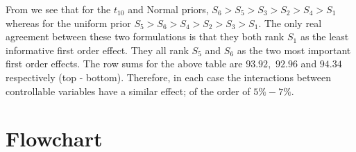 \documentclass[12pt]{article}
\begin{document}
From  we see that for the $t_10$ and Normal priors, $S_6 >  S_5 > S_3 > S_2 > S_4 > S_1$ whereas for the uniform prior $S_5 > S_6 > S_4 > S_2 > S_3 > S_1$. The only real agreement between these two formulations is that they both rank $S_1$ as the least informative first order effect. They all rank $S_5$ and $S_6$ as the two most important first order effects. The row sums for the above table are $93.92,$ $92.96$ and $94.34$ respectively (top - bottom). Therefore, in each case the interactions between controllable variables have a similar effect; of the order of $5\% - 7\%$.

\section{Flowchart}



\newpage
\end{document}
